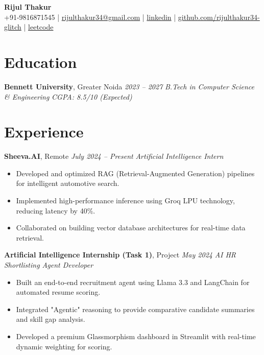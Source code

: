 \documentclass[letterpaper,10pt]{article}
\begin{document}
\begin{center}
    {\LARGE \textbf{Rijul Thakur}}\\[-2pt]
    +91-9816871545 \; | \; \href{mailto:rijulthakur34@gmail.com}{rijulthakur34@gmail.com} \; | \;
    \href{https://www.linkedin.com/in/rijul-thakur-7a1b89310/}{linkedin} \; | \;
    \href{https://github.com/rijulthakur34-glitch}{github.com/rijulthakur34-glitch} \; | \;
    \href{https://leetcode.com/u/falloff/}{leetcode}
\end{center}

\section{Education}
\textbf{Bennett University}, Greater Noida \hfill \textit{2023 -- 2027}  
\textit{B.Tech in Computer Science \& Engineering} \hfill \textit{CGPA: 8.5/10 (Expected)}

\section{Experience}
\textbf{Sheeva.AI}, Remote \hfill \textit{July 2024 -- Present}  
\textit{Artificial Intelligence Intern}
\begin{itemize}
    \item Developed and optimized RAG (Retrieval-Augmented Generation) pipelines for intelligent automotive search.
    \item Implemented high-performance inference using Groq LPU technology, reducing latency by 40\%.
    \item Collaborated on building vector database architectures for real-time data retrieval.
\end{itemize}

\textbf{Artificial Intelligence Internship (Task 1)}, Project \hfill \textit{May 2024}  
\textit{AI HR Shortlisting Agent Developer}
\begin{itemize}
    \item Built an end-to-end recruitment agent using Llama 3.3 and LangChain for automated resume scoring.
    \item Integrated "Agentic" reasoning to provide comparative candidate summaries and skill gap analysis.
    \item Developed a premium Glassmorphism dashboard in Streamlit with real-time dynamic weighting for scoring.
\end{itemize}
\end{document}

